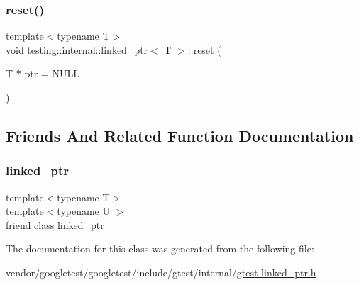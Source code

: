 \mbox{\label{classtesting_1_1internal_1_1linked__ptr_a95ba3b7b66ed0193c779976c6e126ab6}} 
\subsubsection{\texorpdfstring{reset()}{reset()}}
{\footnotesize\ttfamily template$<$typename T$>$ \\
void \hyperlink{classtesting_1_1internal_1_1linked__ptr}{testing\+::internal\+::linked\+\_\+ptr}$<$ T $>$\+::reset (\begin{DoxyParamCaption}\item[{T $\ast$}]{ptr = {\ttfamily NULL} }\end{DoxyParamCaption})\hspace{0.3cm}{\ttfamily [inline]}}



\subsection{Friends And Related Function Documentation}
\mbox{\label{classtesting_1_1internal_1_1linked__ptr_a7763f286ca03a7f7363a033d996c8c1c}} 
\subsubsection{\texorpdfstring{linked\+\_\+ptr}{linked\_ptr}}
{\footnotesize\ttfamily template$<$typename T$>$ \\
template$<$typename U $>$ \\
friend class \hyperlink{classtesting_1_1internal_1_1linked__ptr}{linked\+\_\+ptr}\hspace{0.3cm}{\ttfamily [friend]}}



The documentation for this class was generated from the following file\+:\begin{DoxyCompactItemize}
\item 
vendor/googletest/googletest/include/gtest/internal/\hyperlink{gtest-linked__ptr_8h}{gtest-\/linked\+\_\+ptr.\+h}\end{DoxyCompactItemize}
